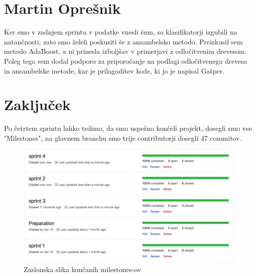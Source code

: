 \documentclass[a4paper,11pt]{article}
\begin{document}
\section{Martin Oprešnik}
Ker smo v zadnjem sprintu v podatke vnesli šum, so klasifikatorji izgubili na natančnosti, zato smo želeli poskusiti še z ansambelsko metodo. Preizkusil sem metodo AdaBoost, a ni prinesla izboljšav v primerjavi z odločitvenim drevesom. Poleg tega sem dodal podporo za priporočanje na podlagi odločitvenega drevesa in ansambelske metode, kar je prilagoditev kode, ki jo je napisal Gašper.

\newpage
\section{Zaključek}
Po četrtem sprintu lahko trdimo, da smo uspešno končeli projekt, dosegli smo vse "Milestones", na glavnem branchu smo trije contributorji dosegli 47 commitov.


\begin{figure}[h]
\caption{Zaslonska slika končanih milestones-ov}
\centering
\includegraphics[width=1\textwidth]{closedsprints}
\end{figure}
\end{document}
